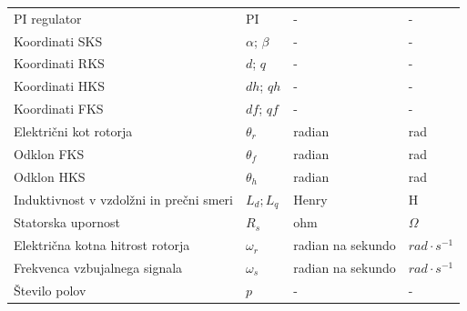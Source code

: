 \documentclass[a4paper,twoside,openright,12pt,slovene]{book}
\begin{document}
\begin{center}
\begin{tabular}{*{4}{l}}
        PI regulator                                               & PI                                     & -                    & -                      \\                                                    
        Koordinati SKS                                             & $\alpha$; $\beta$                      & -                    & -                      \\
        Koordinati RKS                                             & $d$; $q$                               & -                    & -                      \\
        Koordinati HKS                                             & $dh$; $qh$                             & -                    & -                      \\
        Koordinati FKS                                             & $df$; $qf$                             & -                    & -                      \\
        Električni kot rotorja                                     & $\theta_{r}$                           & radian               & rad                    \\
        Odklon FKS                                                 & $\theta_{f}$                           & radian               & rad                    \\
        Odklon HKS                                                 & $\theta_{h}$                           & radian               & rad                    \\
        Induktivnost v vzdolžni in prečni smeri                    & $L_d; L_q$                             & Henry                & H                      \\
        Statorska upornost                                         & $R_s$                                  & ohm                  & $\Omega$               \\
        Električna kotna hitrost rotorja                           & $\omega_r$                             & radian na sekundo    & $rad \cdot s^{-1}$     \\
        Frekvenca vzbujalnega signala                              & $\omega_{s}$                           & radian na sekundo    & $rad \cdot s^{-1}$     \\
        Število polov                                              & $p$                                    & -                    & -                      \\

\end{tabular}
\end{center}
\end{document}
